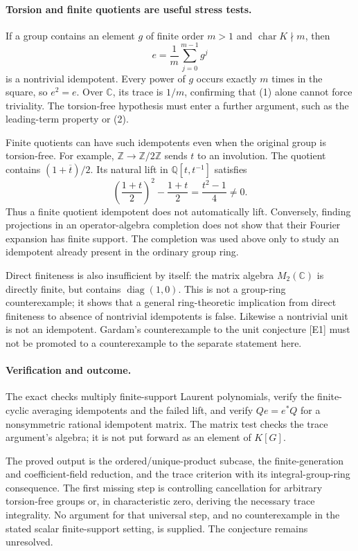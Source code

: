 \documentclass[11pt]{article}
\begin{document}
\paragraph{Torsion and finite quotients are useful stress tests.}
If a group contains an element $g$ of finite order $m>1$ and $\operatorname{char}K\nmid m$, then
\[
 e=\frac1m\sum_{j=0}^{m-1}g^j
\]
is a nontrivial idempotent. Every power of $g$ occurs exactly $m$ times in the square, so $e^2=e$. Over $\mathbb C$, its trace is $1/m$, confirming that (1) alone cannot force triviality. The torsion-free hypothesis must enter a further argument, such as the leading-term property or (2).

Finite quotients can have such idempotents even when the original group is torsion-free. For example, $\mathbb Z\to\mathbb Z/2\mathbb Z$ sends $t$ to an involution. The quotient contains $(1+\overline t)/2$. Its natural lift in $\mathbb Q[t,t^{-1}]$ satisfies
\[
 \left(\frac{1+t}{2}\right)^2-\frac{1+t}{2}
 =\frac{t^2-1}{4}\ne0.
\]
Thus a finite quotient idempotent does not automatically lift. Conversely, finding projections in an operator-algebra completion does not show that their Fourier expansion has finite support. The completion was used above only to study an idempotent already present in the ordinary group ring.

Direct finiteness is also insufficient by itself: the matrix algebra $M_2(\mathbb C)$ is directly finite, but contains $\operatorname{diag}(1,0)$. This is not a group-ring counterexample; it shows that a general ring-theoretic implication from direct finiteness to absence of nontrivial idempotents is false. Likewise a nontrivial unit is not an idempotent. Gardam's counterexample to the unit conjecture [E1] must not be promoted to a counterexample to the separate statement here.

\paragraph{Verification and outcome.}
The exact checks multiply finite-support Laurent polynomials, verify the finite-cyclic averaging idempotents and the failed lift, and verify $Qe=e^*Q$ for a nonsymmetric rational idempotent matrix. The matrix test checks the trace argument's algebra; it is not put forward as an element of $K[G]$.

The proved output is the ordered/unique-product subcase, the finite-generation and coefficient-field reduction, and the trace criterion with its integral-group-ring consequence. The first missing step is controlling cancellation for arbitrary torsion-free groups or, in characteristic zero, deriving the necessary trace integrality. No argument for that universal step, and no counterexample in the stated scalar finite-support setting, is supplied. The conjecture remains unresolved.
\end{document}
